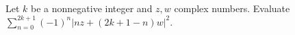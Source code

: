 Let $k$ be a nonnegative integer and $z,w$ complex numbers. Evaluate $\sum_{n=0}^{2k+1}(-1)^n|nz+(2k+1-n)w|^2$.
